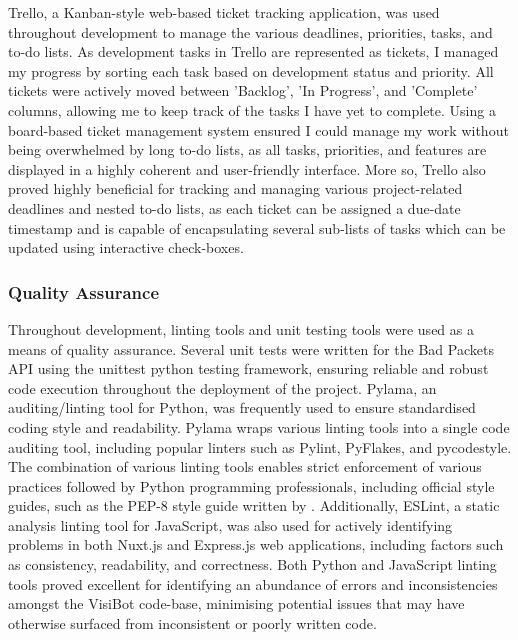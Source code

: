 Trello, a Kanban-style web-based ticket tracking application, was used throughout development to manage the various deadlines, priorities, tasks, and to-do lists.  As development tasks in Trello are represented as tickets, I managed my progress by sorting each task based on development status and priority. All tickets were actively moved between 'Backlog', 'In Progress', and 'Complete' columns, allowing me to keep track of the tasks I have yet to complete. Using a board-based ticket management system ensured I could manage my work without being overwhelmed by long to-do lists, as all tasks, priorities, and features are displayed in a highly coherent and user-friendly interface. More so, Trello also proved highly beneficial for tracking and managing various project-related deadlines and nested to-do lists, as each ticket can be assigned a due-date timestamp and is capable of encapsulating several sub-lists of tasks which can be updated using interactive check-boxes. 

\subsubsection{Quality Assurance}

Throughout development, linting tools and unit testing tools were used as a means of quality assurance. Several unit tests were written for the Bad Packets API using the unittest \citep{uniittest} python testing framework, ensuring reliable and robust code execution throughout the deployment of the project. Pylama, an auditing/linting tool for Python, \citep{pylama} was frequently used to ensure standardised coding style and readability. Pylama wraps various linting tools into a single code auditing tool, including popular linters such as Pylint, PyFlakes, and pycodestyle. The combination of various linting tools enables strict enforcement of various practices followed by Python programming professionals, including official style guides, such as the PEP-8 style guide written by \citet{PEP8}. Additionally, ESLint, \citep{ESLint} a static analysis linting tool for JavaScript, was also used for actively identifying problems in both Nuxt.js and Express.js web applications, including factors such as consistency, readability, and correctness. Both Python and JavaScript linting tools proved excellent for identifying an abundance of errors and inconsistencies amongst the VisiBot code-base, minimising potential issues that may have otherwise surfaced from inconsistent or poorly written code.

